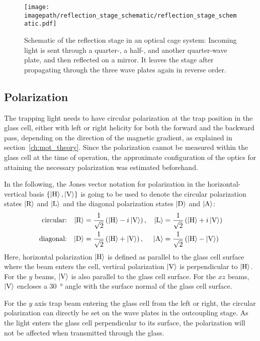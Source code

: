 \begin{figure}
    \centering
    \texttt{[image: \\imagepath/reflection\_stage\_schematic/reflection\_stage\_schematic.pdf]}
    \caption{Schematic of the reflection stage in an optical cage system: Incoming light is sent through a quarter-, a half-, and another quarter-wave plate, and then reflected on a mirror. It leaves the stage after propagating through the three wave plates again in reverse order.}
    \label{fig:reflection_stage_schematic}
\end{figure}

\subsection*{Polarization}
The trapping light needs to have circular polarization at the trap position in the glass cell, either with left or right helicity for both the forward and the backward pass, depending on the direction of the magnetic gradient, as explained in section~\ref{ch:mot_theory}. Since the polarization cannot be measured within the glass cell at the time of operation, the approximate configuration of the optics for attaining the necessary polarization was estimated beforehand.

In the following, the Jones vector notation for polarization in the horizontal-vertical basis $\{\Ket{\text{H}}, \Ket{\text{V}}\}$ is going to be used to denote the circular polarization states $\Ket{\text{R}}$ and $\Ket{\text{L}}$ and the diagonal polarization states $\Ket{\text{D}}$ and $\Ket{\text{A}}$:
\begin{align}
        \text{circular:} && \Ket{\text{R}} &= \frac{1}{\sqrt{2}} \left(\Ket{\text{H}} - i \Ket{\text{V}}\right),  & \Ket{\text{L}} &= \frac{1}{\sqrt{2}} \left(\Ket{\text{H}} + i \Ket{\text{V}}\right) \\
        \text{diagonal:} && \Ket{\text{D}} &= \frac{1}{\sqrt{2}} \left(\Ket{\text{H}} + \Ket{\text{V}}\right),  &  \Ket{\text{A}} &= \frac{1}{\sqrt{2}} \left(\Ket{\text{H}} - \Ket{\text{V}}\right)
\end{align}
Here, horizontal polarization $\Ket{\text{H}}$ is defined as parallel to the glass cell surface  where the beam enters the cell, vertical polarization $\Ket{\text{V}}$ is perpendicular to $\Ket{\text{H}}$. For the $y$ beams, $\Ket{\text{V}}$ is also parallel to the glass cell surface. For the $xz$ beams, $\Ket{\text{V}}$ encloses a \SI{30}{\degree} angle with the surface normal of the glass cell surface.

For the $y$ axis trap beam entering the glass cell from the left or right, the circular polarization can directly be set on the wave plates in the outcoupling stage. As the light enters the glass cell perpendicular to its surface, the polarization will not be affected when transmitted through the glass.

